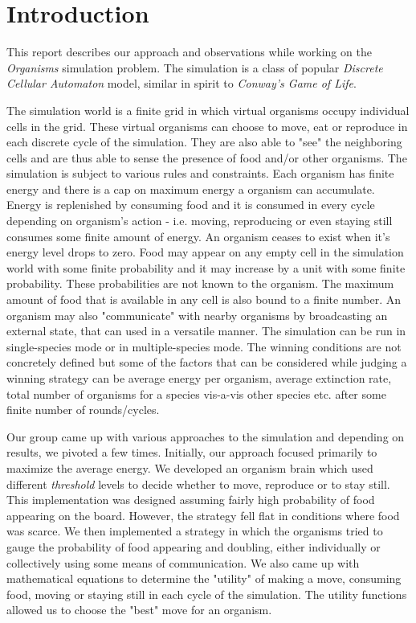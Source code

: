 \section{Introduction}

This report describes our approach and observations while working on the 
{\em Organisms} simulation problem. The simulation is a class of popular
{\em Discrete Cellular Automaton} model, similar in spirit to 
{\em Conway's Game of Life}.

The simulation world is a finite grid in which virtual organisms occupy 
individual cells in the grid. These virtual organisms can choose to move, 
eat or reproduce in each discrete cycle of the simulation. They are also 
able to "see" the neighboring cells and are thus able to sense the presence 
of food and/or other organisms. The simulation is subject to various rules 
and  constraints. Each organism has finite energy and there is a cap on 
maximum energy a organism can accumulate. Energy is replenished by consuming 
food and it is consumed in every cycle depending on organism's action - 
i.e. moving, reproducing or even staying still consumes some finite amount 
of energy.  An organism ceases to exist when it's energy level drops to zero.
Food may appear on any empty cell in the simulation world with some finite
probability and it may increase by a unit with some finite probability. 
These probabilities are not known to the organism. The maximum amount of 
food that is available in any cell is also bound to a finite number. 
An organism may also "communicate" with nearby organisms by broadcasting an 
external state, that can used in a versatile manner.
The simulation can be run in single-species mode or in multiple-species mode. 
The winning conditions are not concretely defined but some of the factors 
that can be considered while judging a winning strategy can be 
average energy per organism, average extinction rate, total number of
organisms for a species vis-a-vis other species etc. after some finite 
number of rounds/cycles.

Our group came up with various approaches to the simulation and depending on 
results, we pivoted a few times. Initially, our approach focused primarily 
to maximize the average energy. We developed an organism brain which used
different {\em threshold} levels to decide whether to move, reproduce or to 
stay still. This implementation was designed assuming fairly high probability
of food appearing on the board. However, the strategy fell flat in conditions 
where food was scarce. We then implemented a strategy in which the organisms 
tried to gauge the probability of food appearing and doubling, either 
individually or collectively using some means of communication. We also came 
up with mathematical equations to determine the "utility" of making a move, 
consuming food, moving or staying still in each cycle of the simulation. 
The utility functions allowed us to choose the "best" move for an organism. 

